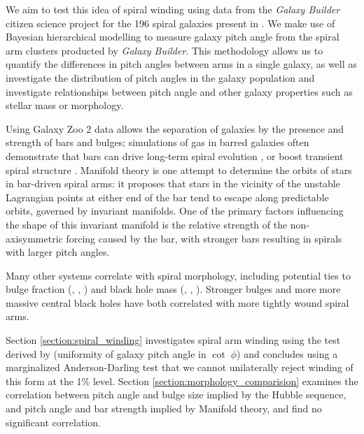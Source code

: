 We aim to test this idea of spiral winding using data from the \textit{Galaxy Builder} citizen science project for the 196 spiral galaxies present in \Lingard. We make use of Bayesian hierarchical modelling to measure galaxy pitch angle from the spiral arm clusters producted by \textit{Galaxy Builder}. This methodology allows us to quantify the differences in pitch angles between arms in a single galaxy, as well as investigate the distribution of pitch angles in the galaxy population and investigate relationships between pitch angle and other galaxy properties such as stellar mass or morphology.

Using Galaxy Zoo 2 data \citep{Willett2013:1308.3496v2} allows the separation of galaxies by the presence and strength of bars and bulges; simulations of gas in barred galaxies often demonstrate that bars can drive long-term spiral evolution \citep{2008A&A...489..115R}, or boost transient spiral structure \citep{2012MNRAS.426..167G}. Manifold theory is one attempt to determine the orbits of stars in bar-driven spiral arms: it proposes that stars in the vicinity of the unstable Lagrangian points at either end of the bar tend to escape along predictable orbits, governed by invariant manifolds. One of the primary factors influencing the shape of this invariant manifold is the relative strength of the non-axisymmetric forcing caused by the bar, with stronger bars resulting in spirals with larger pitch angles.

Many other systems correlate with spiral morphology, including potential ties to bulge fraction (\citealt{1975A&A....44..363Y}, \citealt{2013MNRAS.436.1074S}, \citealt{2019MNRAS.487.1808M}) and black hole mass (\citealt{2008ApJ...678L..93S}, \citealt{2017MNRAS.471.2187D}, \citealt{2019MS&E..571a2118A}). Stronger bulges and more more massive central black holes have both correlated with more tightly wound spiral arms.

Section \ref{section:spiral_winding} investigates spiral arm winding using the test derived by \cite{2019arXiv190910291P} (uniformity of galaxy pitch angle in $\cot\;\phi$) and concludes using a marginalized Anderson-Darling test that we cannot unilaterally reject winding of this form at the 1\% level. Section \ref{section:morphology_comparision} examines the correlation between pitch angle and bulge size implied by the Hubble sequence, and pitch angle and bar strength implied by Manifold theory, and find no significant correlation.
